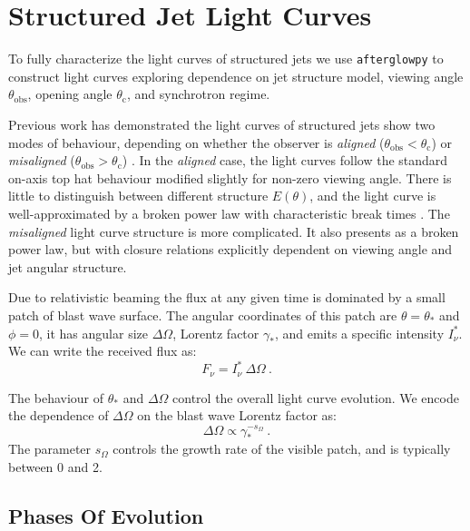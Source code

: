 \documentclass[twocolumn]{aastex62}
\newcommand{\afterglowpy}{{\tt afterglowpy}}
\newcommand{\thobs}{\ensuremath{\theta_{\mathrm{obs}}}}
\newcommand{\thC}{\ensuremath{\theta_{\mathrm{c}}}}
\newcommand{\som}{\ensuremath{s_{\Omega}}}
\begin{document}
\section{Structured Jet Light Curves}\label{sec:structuredJets}

To fully characterize the light curves of structured jets we use \afterglowpy{} to construct light curves exploring dependence on jet structure model, viewing angle $\thobs$, opening angle $\thC$, and synchrotron regime.  

Previous work has demonstrated the light curves of structured jets show two modes of behaviour, depending on whether the observer is \emph{aligned} ($\thobs < \thC$) or \emph{misaligned} ($\thobs > \thC$) \citep{Rossi:2002aa, Granot:2002ab, Panaitescu:2003aa, van-Eerten:2010aa}.
In the \emph{aligned} case, the light curves follow the standard on-axis top hat behaviour modified slightly for non-zero viewing angle.  There is little to distinguish between different structure $E(\theta)$, and the light curve is well-approximated by a broken power law with characteristic break times \citep{Granot:2002aa}.  The \emph{misaligned} light curve structure is more complicated.  It also presents as a broken power law, but with closure relations explicitly dependent on viewing angle and jet angular structure.  

Due to relativistic beaming the flux at any given time is dominated by a small patch of blast wave surface.  The angular coordinates of this patch are $\theta = \theta_*$ and $\phi=0$, it has angular size $\Delta \Omega$, Lorentz factor $\gamma_*$, and emits a specific intensity $I_\nu^*$. We can write the received flux as:
\begin{equation}
	F_\nu = I_\nu^*\ \Delta \Omega\ .
\end{equation}

The behaviour of $\theta_*$ and $\Delta \Omega$ control the overall light curve evolution.  We encode the dependence of $\Delta \Omega$ on the blast wave Lorentz factor as:
\begin{equation}
	\Delta \Omega \propto \gamma_*^{-\som} \ .
\end{equation}
The parameter $\som$ controls the growth rate of the visible patch, and is typically between 0 and 2. 

\subsection{Phases Of Evolution} \label{subsec:phases}
\end{document}
